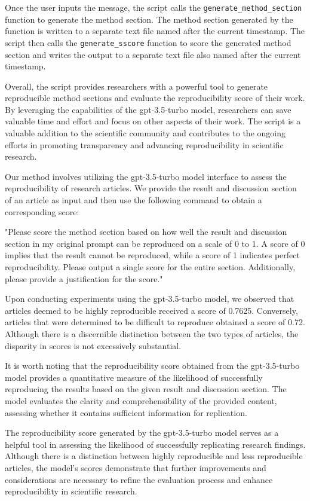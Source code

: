 \documentclass[12pt, a4paper, twocolumn]{article}
\begin{document}
Once the user inputs the message, the script calls the \texttt{generate\_method\_section} function to generate the method section. The method section generated by the function is written to a separate text file named after the current timestamp. The script then calls the \texttt{generate\_sscore} function to score the generated method section and writes the output to a separate text file also named after the current timestamp.

Overall, the script provides researchers with a powerful tool to generate reproducible method sections and evaluate the reproducibility score of their work. By leveraging the capabilities of the gpt-3.5-turbo model, researchers can save valuable time and effort and focus on other aspects of their work. The script is a valuable addition to the scientific community and contributes to the ongoing efforts in promoting transparency and advancing reproducibility in scientific research.

		Our method involves utilizing the gpt-3.5-turbo model interface to assess the reproducibility of research articles. We provide the result and discussion section of an article as input and then use the following command to obtain a corresponding score:

"Please score the method section based on how well the result and discussion section
in my original prompt can be reproduced on a scale of 0 to 1. A score of 0 implies that 
the result cannot be reproduced, while a score of 1 indicates perfect reproducibility. 
Please output a single score for the entire section. Additionally, please provide a 
justification for the score."

Upon conducting experiments using the gpt-3.5-turbo model, we observed that articles deemed to be highly reproducible received a score of 0.7625. Conversely, articles that were determined to be difficult to reproduce obtained a score of 0.72. Although there is a discernible distinction between the two types of articles, the disparity in scores is not excessively substantial.

It is worth noting that the reproducibility score obtained from the gpt-3.5-turbo model provides a quantitative measure of the likelihood of successfully reproducing the results based on the given result and discussion section. The model evaluates the clarity and comprehensibility of the provided content, assessing whether it contains sufficient information for replication.

The reproducibility score generated by the gpt-3.5-turbo model serves as a helpful tool in assessing the likelihood of successfully replicating research findings. Although there is a distinction between highly reproducible and less reproducible articles, the model's scores demonstrate that further improvements and considerations are necessary to refine the evaluation process and enhance reproducibility in scientific research.
\end{document}
